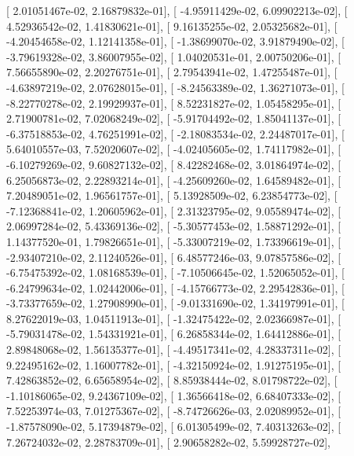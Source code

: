 \documentclass{article}
\begin{document}
       [  2.01051467e-02,   2.16879832e-01],
       [ -4.95911429e-02,   6.09902213e-02],
       [  4.52936542e-02,   1.41830621e-01],
       [  9.16135255e-02,   2.05325682e-01],
       [ -4.20454658e-02,   1.12141358e-01],
       [ -1.38699070e-02,   3.91879490e-02],
       [ -3.79619328e-02,   3.86007955e-02],
       [  1.04020531e-01,   2.00750206e-01],
       [  7.56655890e-02,   2.20276751e-01],
       [  2.79543941e-02,   1.47255487e-01],
       [ -4.63897219e-02,   2.07628015e-01],
       [ -8.24563389e-02,   1.36271073e-01],
       [ -8.22770278e-02,   2.19929937e-01],
       [  8.52231827e-02,   1.05458295e-01],
       [  2.71900781e-02,   7.02068249e-02],
       [ -5.91704492e-02,   1.85041137e-01],
       [ -6.37518853e-02,   4.76251991e-02],
       [ -2.18083534e-02,   2.24487017e-01],
       [  5.64010557e-03,   7.52020607e-02],
       [ -4.02405605e-02,   1.74117982e-01],
       [ -6.10279269e-02,   9.60827132e-02],
       [  8.42282468e-02,   3.01864974e-02],
       [  6.25056873e-02,   2.22893214e-01],
       [ -4.25609260e-02,   1.64589482e-01],
       [  7.20489051e-02,   1.96561757e-01],
       [  5.13928509e-02,   6.23854773e-02],
       [ -7.12368841e-02,   1.20605962e-01],
       [  2.31323795e-02,   9.05589474e-02],
       [  2.06997284e-02,   5.43369136e-02],
       [ -5.30577453e-02,   1.58871292e-01],
       [  1.14377520e-01,   1.79826651e-01],
       [ -5.33007219e-02,   1.73396619e-01],
       [ -2.93407210e-02,   2.11240526e-01],
       [  6.48577246e-03,   9.07857586e-02],
       [ -6.75475392e-02,   1.08168539e-01],
       [ -7.10506645e-02,   1.52065052e-01],
       [ -6.24799634e-02,   1.02442006e-01],
       [ -4.15766773e-02,   2.29542836e-01],
       [ -3.73377659e-02,   1.27908990e-01],
       [ -9.01331690e-02,   1.34197991e-01],
       [  8.27622019e-03,   1.04511913e-01],
       [ -1.32475422e-02,   2.02366987e-01],
       [ -5.79031478e-02,   1.54331921e-01],
       [  6.26858344e-02,   1.64412886e-01],
       [  2.89848068e-02,   1.56135377e-01],
       [ -4.49517341e-02,   4.28337311e-02],
       [  9.22495162e-02,   1.16007782e-01],
       [ -4.32150924e-02,   1.91275195e-01],
       [  7.42863852e-02,   6.65658954e-02],
       [  8.85938444e-02,   8.01798722e-02],
       [ -1.10186065e-02,   9.24367109e-02],
       [  1.36566418e-02,   6.68407333e-02],
       [  7.52253974e-03,   7.01275367e-02],
       [ -8.74726626e-03,   2.02089952e-01],
       [ -1.87578090e-02,   5.17394879e-02],
       [  6.01305499e-02,   7.40313263e-02],
       [  7.26724032e-02,   2.28783709e-01],
       [  2.90658282e-02,   5.59928727e-02],
\end{document}

